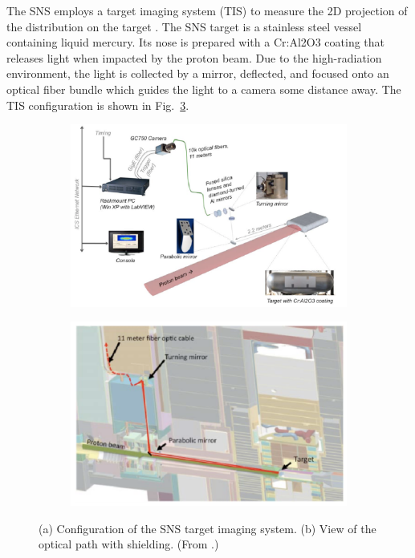 The SNS employs a target imaging system (TIS) to measure the 2D projection of the distribution on the target \cite{Blokland2010}. The SNS target is a stainless steel vessel containing liquid mercury. Its nose is prepared with a Cr:Al2O3 coating that releases light when impacted by the proton beam. Due to the high-radiation environment, the light is collected by a mirror, deflected, and focused onto an optical fiber bundle which guides the light to a camera some distance away. The TIS configuration is shown in Fig.~\ref{fig:tis}.
%
\begin{figure}[!p]
    \centering
    \begin{subfigure}{\textwidth}
        \includegraphics[width=\textwidth]{Images/chapter4/tis1.png}
        \caption{}
        \label{fig:tis_a}
    \end{subfigure}
    \vfill
    \vspace*{2.0cm}
    \vfill
    \begin{subfigure}{0.5\textwidth}
        \includegraphics[width=\textwidth]{Images/chapter4/tis2.png}
        \caption{}
        \label{fig:tis_b}
    \end{subfigure}
    \caption{(a) Configuration of the SNS target imaging system. (b) View of the optical path with shielding. (From \cite{Blokland2010}.)}
    \label{fig:tis}
\end{figure}
%

